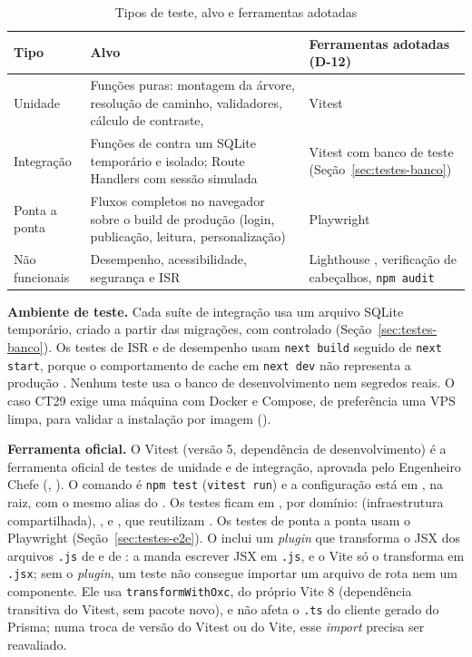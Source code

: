 \begin{table}[htb]
\caption{Tipos de teste, alvo e ferramentas adotadas}\label{tab:tipos-teste}
\small
\begin{tabularx}{\linewidth}{@{}L{2.6cm}YL{4.2cm}@{}}
\toprule
\textbf{Tipo} & \textbf{Alvo} & \textbf{Ferramentas adotadas (D-12)}\\
\midrule
Unidade & Funções puras: montagem da árvore, resolução de caminho, validadores, cálculo de contraste,  & Vitest \cite{vitest}\\
\addlinespace
Integração & Funções de  contra um SQLite temporário e isolado; Route Handlers com sessão simulada & Vitest com banco de teste (Seção~\ref{sec:testes-banco})\\
\addlinespace
Ponta a ponta & Fluxos completos no navegador sobre o build de produção (login, publicação, leitura, personalização) & Playwright \cite{playwright}\\
\addlinespace
Não funcionais & Desempenho, acessibilidade, segurança e ISR & Lighthouse \cite{lighthouse}, verificação de cabeçalhos, \texttt{npm audit}\\
\bottomrule
\end{tabularx}
\end{table}

\textbf{Ambiente de teste.} Cada suíte de integração usa um arquivo SQLite temporário, criado a partir das migrações, com  controlado (Seção~\ref{sec:testes-banco}). Os testes de ISR e de desempenho usam \texttt{next build} seguido de \texttt{next start}, porque o comportamento de cache em \texttt{next dev} não representa a produção \cite{nextjsdocs}. Nenhum teste usa o banco de desenvolvimento nem segredos reais. O caso CT29 exige uma máquina com Docker e Compose, de preferência uma VPS limpa, para validar a instalação por imagem ().

\textbf{Ferramenta oficial.} O Vitest \cite{vitest} (versão 5, dependência de desenvolvimento) é a ferramenta oficial de testes de unidade e de integração, aprovada pelo Engenheiro Chefe (, ). O comando é \texttt{npm test} (\texttt{vitest run}) e a configuração está em , na raiz, com o mesmo alias  do . Os testes ficam em , por domínio:  (infraestrutura compartilhada), ,  e , que reutilizam . Os testes de ponta a ponta usam o Playwright \cite{playwright} (Seção~\ref{sec:testes-e2e}). O  inclui um \emph{plugin} que transforma o JSX dos arquivos \texttt{.js} de  e de : a  manda escrever JSX em \texttt{.js}, e o Vite só o transforma em \texttt{.jsx}; sem o \emph{plugin}, um teste não consegue importar um arquivo de rota nem um componente. Ele usa \texttt{transformWithOxc}, do próprio Vite 8 (dependência transitiva do Vitest, sem pacote novo), e não afeta o \texttt{.ts} do cliente gerado do Prisma; numa troca de versão do Vitest ou do Vite, esse \emph{import} precisa ser reavaliado.

